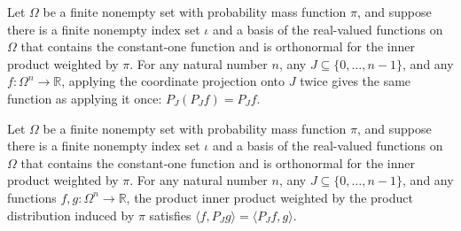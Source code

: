 \begin{theorem}
\label{FABL.projectOnCoordinates_idempotent}
\leanok
{}
Let $\Omega$ be a finite nonempty set with probability mass function $\pi$, and suppose
there is a finite nonempty index set $\iota$ and a basis of the real-valued functions on
$\Omega$ that contains the constant-one function and is orthonormal for the inner
product weighted by $\pi$. For any natural number $n$, any $J\subseteq\{0,\ldots,n-1\}$,
and any $f:\Omega^n\to\mathbb{R}$, applying the coordinate projection onto $J$ twice
gives the same function as applying it once: $P_J(P_Jf)=P_Jf$.
\end{theorem}

\begin{theorem}
\label{FABL.projectOnCoordinates_selfAdjoint}
\leanok
{}
Let $\Omega$ be a finite nonempty set with probability mass function $\pi$, and suppose
there is a finite nonempty index set $\iota$ and a basis of the real-valued functions on
$\Omega$ that contains the constant-one function and is orthonormal for the inner
product weighted by $\pi$. For any natural number $n$, any $J\subseteq\{0,\ldots,n-1\}$,
and any functions $f,g:\Omega^n\to\mathbb{R}$, the product inner product weighted by the
product distribution induced by $\pi$ satisfies $\langle f,P_Jg\rangle=\langle
P_Jf,g\rangle$.
\end{theorem}

